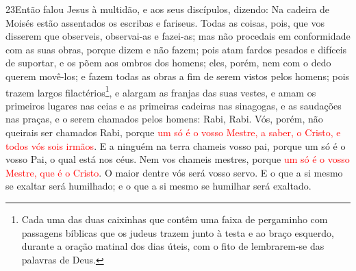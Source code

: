 \lettrine{23} Então falou Jesus à multidão, e aos seus
discípulos, dizendo: Na cadeira de Moisés estão assentados os
escribas e fariseus. Todas as coisas, pois, que vos disserem que
observeis, observai-as e fazei-as; mas não procedais em conformidade
com as suas obras, porque dizem e não fazem; pois atam fardos
pesados e difíceis de suportar, e os põem aos ombros dos homens;
eles, porém, nem com o dedo querem movê-los; e fazem todas as
obras a fim de serem vistos pelos homens; pois trazem largos
filactérios\footnote{Cada uma das duas caixinhas que contêm uma
faixa de pergaminho com passagens bíblicas que os judeus trazem
junto à testa e ao braço esquerdo, durante a oração matinal dos dias
úteis, com o fito de lembrarem-se das palavras de Deus.}, e alargam
as franjas das suas vestes, e amam os primeiros lugares nas
ceias e as primeiras cadeiras nas sinagogas, e as saudações nas
praças, e o serem chamados pelos homens: Rabi, Rabi. Vós, porém,
não queirais ser chamados Rabi, porque \textcolor{red}{um só é o vosso
Mestre, a saber, o Cristo, e todos vós sois irmãos}. E a ninguém
na terra chameis vosso pai, porque um só é o vosso Pai, o qual está
nos céus. Nem vos chameis mestres, porque \textcolor{red}{um só é o
vosso Mestre, que é o Cristo}. O maior dentre vós será vosso
servo. E o que a si mesmo se exaltar será humilhado; e o que
a si mesmo se humilhar será exaltado.

